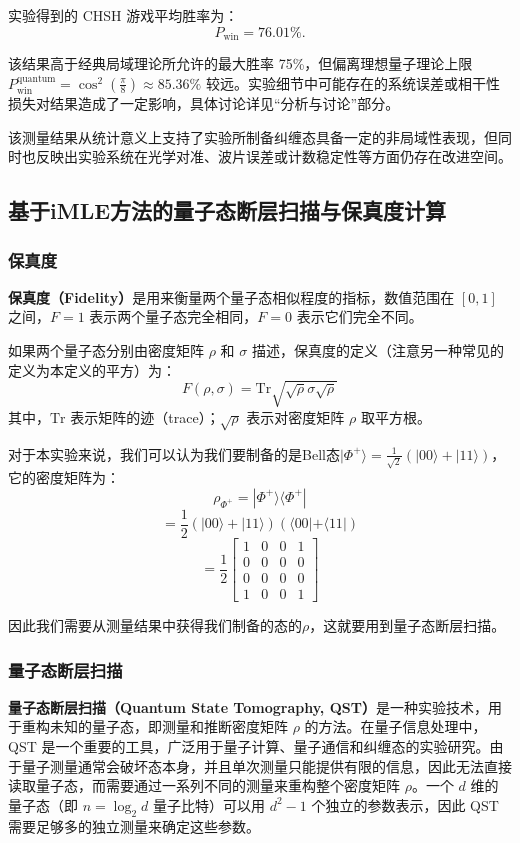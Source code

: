 实验得到的 CHSH 游戏平均胜率为：
\[
P_\text{win} = 76.01\%.
\]

该结果高于经典局域理论所允许的最大胜率 75\%，但偏离理想量子理论上限 $P_\text{win}^\text{quantum} = \cos^2\left(\frac{\pi}{8}\right) \approx 85.36\%$ 较远。实验细节中可能存在的系统误差或相干性损失对结果造成了一定影响，具体讨论详见“分析与讨论”部分。

该测量结果从统计意义上支持了实验所制备纠缠态具备一定的非局域性表现，但同时也反映出实验系统在光学对准、波片误差或计数稳定性等方面仍存在改进空间。


\subsection{基于iMLE方法的量子态断层扫描与保真度计算}

\subsubsection{保真度}
\textbf{保真度（Fidelity）}是用来衡量两个量子态相似程度的指标，数值范围在 \([0,1]\) 之间，\( F = 1 \) 表示两个量子态完全相同，\( F = 0 \) 表示它们完全不同。

如果两个量子态分别由密度矩阵 \( \rho \) 和 \( \sigma \) 描述，保真度的定义（注意另一种常见的定义为本定义的平方）为：
\[
F(\rho, \sigma) =  \text{Tr} \sqrt{\sqrt{\rho} \sigma \sqrt{\rho}} 
\]
其中，\( \text{Tr} \) 表示矩阵的迹（trace）；\( \sqrt{\rho} \) 表示对密度矩阵 \( \rho \) 取平方根。

对于本实验来说，我们可以认为我们要制备的是Bell态$|\Phi^+\rangle = \frac{1}{\sqrt{2}} (|00\rangle + |11\rangle)$，它的密度矩阵为：
\[
\rho_{\Phi^+} = |\Phi^+\rangle \langle \Phi^+|
\]
\[
= \frac{1}{2} (|00\rangle + |11\rangle)(\langle 00| + \langle 11|)
\]
\[
= \frac{1}{2} \begin{bmatrix} 
	1 & 0 & 0 & 1 \\ 
	0 & 0 & 0 & 0 \\ 
	0 & 0 & 0 & 0 \\ 
	1 & 0 & 0 & 1
\end{bmatrix}
\]

因此我们需要从测量结果中获得我们制备的态的$\rho$，这就要用到量子态断层扫描。

\subsubsection{量子态断层扫描}
\textbf{量子态断层扫描（Quantum State Tomography, QST）}是一种实验技术，用于重构未知的量子态，即测量和推断密度矩阵 \( \rho \) 的方法。在量子信息处理中，QST 是一个重要的工具，广泛用于量子计算、量子通信和纠缠态的实验研究。由于量子测量通常会破坏态本身，并且单次测量只能提供有限的信息，因此无法直接读取量子态，而需要通过一系列不同的测量来重构整个密度矩阵 \( \rho \)。一个 \( d \) 维的量子态（即 \( n = \log_2 d \) 量子比特）可以用 \( d^2 - 1 \) 个独立的参数表示，因此 QST 需要足够多的独立测量来确定这些参数。  

